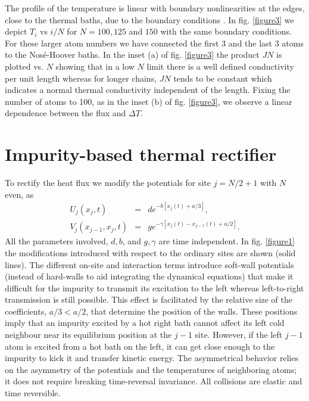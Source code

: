 The profile of the temperature is linear with boundary nonlinearities at the edges, close to the thermal baths,  due to the boundary conditions \cite{Lepri1997}. In fig. \ref{figure3} we depict $T_i$ vs $i/N$ for $N=100, 125$ and $150$ with the same boundary conditions. For these
larger atom numbers  we have connected the first 3 and the last 3 atoms to the Nos\'e-Hoover baths.
In the inset (a) of fig. \ref{figure3}  the product $JN$ is plotted vs. $N$ showing that in a low $N$ limit there is a well defined conductivity per unit length whereas for longer chains, $JN$ tends to be constant  which indicates a normal thermal conductivity independent of the length. Fixing the number of atoms to 100, as in the inset (b) of fig. \ref{figure3},  we observe a linear dependence between the flux and $\Delta T$.

\section{Impurity-based thermal rectifier}

To rectify the heat flux
we modify the potentials for site $j=N/2+1$ with $N$ even, as
%
%
\begin{eqnarray}
\label{IMP}
U_j(x_j,t)&=&d e^{-b [x_j(t)+a/3]},
\\
V_j(x_{j-1},x_j,t)&=&ge^{-\gamma [x_j(t)-x_{j-1}(t)+a/2]}.
\end{eqnarray}
%
All the parameters involved, $d, b$, and $g,\gamma$ are time independent. In fig. \ref{figure1} the modifications introduced with respect to the ordinary sites are shown (solid lines).  The different on-site and interaction terms introduce soft-wall potentials
(instead of hard-walls to aid integrating the dynamical equations) that make it difficult for the impurity to transmit its excitation to the left whereas left-to-right transmission is still possible.
This effect is facilitated by the relative size of the coefficients, $a/3<a/2$, that determine the position of the walls.
These positions imply that an impurity excited by a hot right bath cannot affect its left cold neighbour near its equilibrium position at the $j-1$ site.
However, if the left $j-1$ atom is excited from a hot bath on the left,
it can get close enough to the impurity to kick it and transfer kinetic energy.
The asymmetrical behavior relies on the asymmetry of the potentials and the temperatures of
neighboring atoms; it does not require
breaking time-reversal invariance. All collisions are elastic and time reversible.

